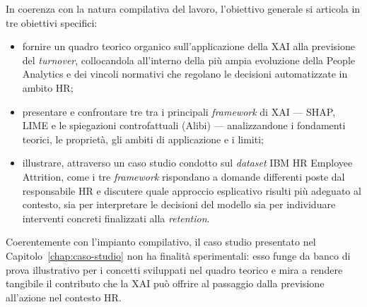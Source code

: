 In coerenza con la natura compilativa del lavoro, l'obiettivo generale si articola in tre obiettivi specifici:
\begin{itemize}
    \item fornire un quadro teorico organico sull'applicazione della XAI alla previsione del \textit{turnover}, collocandola all'interno della più ampia evoluzione della People Analytics e dei vincoli normativi che regolano le decisioni automatizzate in ambito HR;
    \item presentare e confrontare tre tra i principali \textit{framework} di XAI --- SHAP, LIME e le spiegazioni controfattuali (Alibi) --- analizzandone i fondamenti teorici, le proprietà, gli ambiti di applicazione e i limiti;
    \item illustrare, attraverso un caso studio condotto sul \textit{dataset} IBM HR Employee Attrition, come i tre \textit{framework} rispondano a domande differenti poste dal responsabile HR e discutere quale approccio esplicativo risulti più adeguato al contesto, sia per interpretare le decisioni del modello sia per individuare interventi concreti finalizzati alla \textit{retention}.
\end{itemize}

Coerentemente con l'impianto compilativo, il caso studio presentato nel Capitolo~\ref{chap:caso-studio} non ha finalità sperimentali: esso funge da banco di prova illustrativo per i concetti sviluppati nel quadro teorico e mira a rendere tangibile il contributo che la XAI può offrire al passaggio dalla previsione all'azione nel contesto HR.
